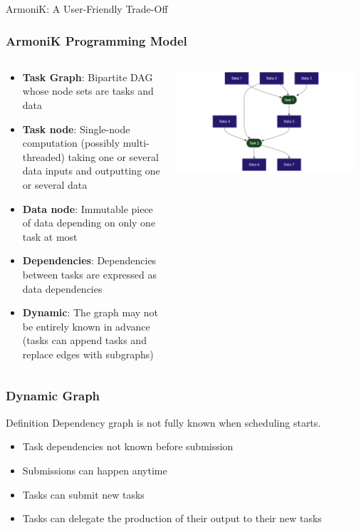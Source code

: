 \documentclass[10pt,aspectratio=1609]{beamer}
\begin{document}
\begin{section}{ArmoniK: A User-Friendly Trade-Off}
 \begin{frame}
   \frametitle{ArmoniK Programming Model}
   \begin{columns}[T]
     \begin{column}{0.5\textwidth}
       \begin{itemize}
         \item \textbf{Task Graph}: Bipartite DAG whose node sets are tasks and data
         \item \textbf{Task node}: Single-node computation (possibly multi-threaded) taking one or several data inputs and outputting one or several data
         \item \textbf{Data node}: Immutable piece of data depending on only one task at most
         \item \textbf{Dependencies}: Dependencies between tasks are expressed as data dependencies
         \item \textbf{Dynamic}: The graph may not be entirely known in advance (tasks can append tasks and replace edges with subgraphs)
       \end{itemize}
     \end{column}
     \begin{column}{0.5\textwidth}
       \centering
       \includegraphics[width=0.95\textwidth]{mermaid-task-graph.png}
     \end{column}
   \end{columns}
 \end{frame}

 \begin{frame}
   \frametitle{Dynamic Graph}
   \begin{block}{Definition}
     Dependency graph is not fully known when scheduling starts.
   \end{block}
   \begin{itemize}
     \item Task dependencies not known before submission
     \item Submissions can happen anytime
     \item Tasks can submit new tasks
     \item Tasks can delegate the production of their output to their new tasks
   \end{itemize}
   \footnotesize
   \inputminted[frame=single]{python}{subtasking.py}
 \end{frame}


\end{section}
\end{document}
